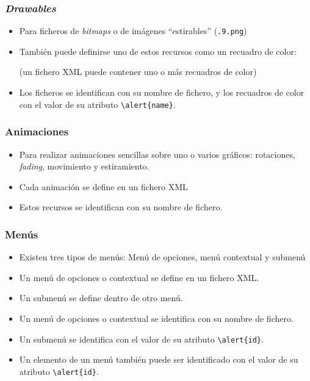 \documentclass[hyperref={pdfpagelabels=true},ucs]{beamer}
\begin{document}
\begin{frame}[fragile]
\frametitle{\emph{Drawables}}

\begin{itemize}
\item Para ficheros de \emph{bitmaps} o de imágenes ``estirables''
  (\verb|.9.png|)
\item También puede definirse uno de estos recursos como un recuadro
  de color: 
\begin{tiny}
\begin{block}{}
\end{block}
\end{tiny}
(un fichero XML puede contener uno o más recuadros de color)

\item \alert{Los ficheros se identifican con su nombre de fichero, y
    los recuadros de color con el valor de su atributo} \Verb|\alert{name}|.
\end{itemize}

\end{frame}


\begin{frame}[fragile]
\frametitle{Animaciones}

\begin{itemize}
\item Para realizar animaciones sencillas sobre uno o varios gráficos:
  rotaciones, \emph{fading}, movimiento y estiramiento.
\item Cada animación se define en un fichero XML
\item \alert{Estos recursos se identifican con su nombre de fichero}.
\end{itemize}

\end{frame}


\begin{frame}[fragile]
\frametitle{Menús}

\begin{itemize}
\item Existen tres tipos de menús: Menú de opciones, menú contextual y
  submenú
\item Un menú de opciones o contextual se define en un fichero XML.
\item Un submenú se define dentro de otro menú.
\item \alert{Un menú de opciones o contextual se identifica con su
    nombre de fichero}.
\item \alert{Un submenú se identifica con el valor de su atributo}
  \Verb|\alert{id}|.
\item \alert{Un elemento de un menú también puede ser identificado con el
    valor de su atributo} \Verb|\alert{id}|.
\end{itemize}

\end{frame}
\end{document}
